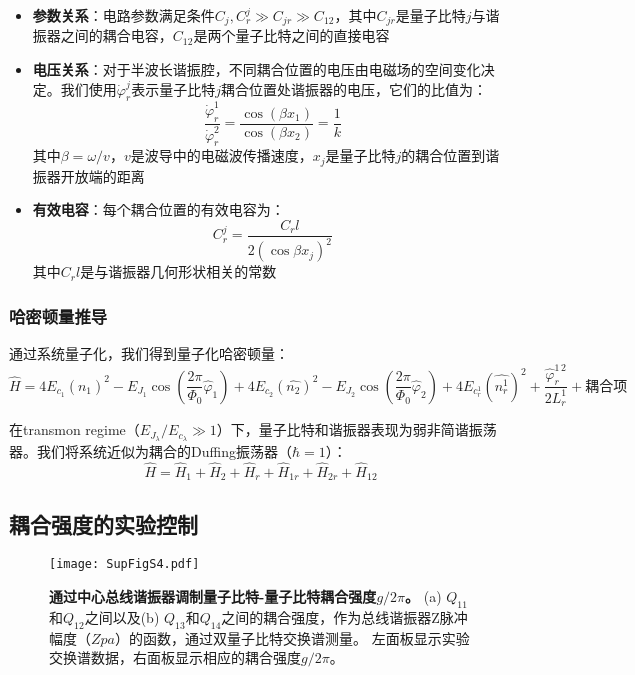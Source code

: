 \documentclass[11pt,a4paper]{article}
\begin{document}
\begin{itemize}
    \item \textbf{参数关系}：电路参数满足条件$C_j, C_r^j \gg C_{jr} \gg C_{12}$，其中$C_{jr}$是量子比特$j$与谐振器之间的耦合电容，$C_{12}$是两个量子比特之间的直接电容
    \item \textbf{电压关系}：对于半波长谐振腔，不同耦合位置的电压由电磁场的空间变化决定。我们使用$\dot{\varphi}_r^j$表示量子比特$j$耦合位置处谐振器的电压，它们的比值为：
    \[
    \frac{\dot{\varphi}_r^1}{\dot{\varphi}_r^2} = \frac{\cos(\beta x_1)}{\cos(\beta x_2)} = \frac{1}{k}
    \]
    其中$\beta = \omega/v$，$v$是波导中的电磁波传播速度，$x_j$是量子比特$j$的耦合位置到谐振器开放端的距离
    \item \textbf{有效电容}：每个耦合位置的有效电容为：
    \[
    C_r^j = \frac{C_r l}{2(\cos\beta x_j)^2}
    \]
    其中$C_r l$是与谐振器几何形状相关的常数
\end{itemize}

\subsubsection{哈密顿量推导}

通过系统量子化，我们得到量子化哈密顿量：
\[
\hat{H} = 4E_{c_1}(\hat{n_1})^2 - E_{J_1}\cos\left(\frac{2\pi}{\Phi_0}\hat{\varphi}_1\right) + 4E_{c_2}(\hat{n_2})^2 - E_{J_2}\cos\left(\frac{2\pi}{\Phi_0}\hat{\varphi}_2\right) + 4E_{c^1_r}(\hat{n^1_r})^2 + \frac{\hat{\varphi}^{1\,2}_r}{2L^1_r} + \text{耦合项}
\]

在transmon regime（$E_{J_\lambda}/E_{c_\lambda} \gg 1$）下，量子比特和谐振器表现为弱非简谐振荡器。我们将系统近似为耦合的Duffing振荡器（$\hbar=1$）：
\[
\hat{H} = \hat{H}_1 + \hat{H}_2 + \hat{H}_r + \hat{H}_{1r} + \hat{H}_{2r} + \hat{H}_{12}
\]

\subsection{耦合强度的实验控制}

\begin{figure}[H]
    \centering
    \texttt{[image: SupFigS4.pdf]}
    \caption{
        \textbf{通过中心总线谐振器调制量子比特-量子比特耦合强度$g/2\pi$。}
        (a) $Q_{11}$和$Q_{12}$之间以及(b) $Q_{13}$和$Q_{14}$之间的耦合强度，作为总线谐振器Z脉冲幅度（$Zpa$）的函数，通过双量子比特交换谱测量。
        左面板显示实验交换谱数据，右面板显示相应的耦合强度$g/2\pi$。
    }
    \label{fig:coupling_modulation}
\end{figure}
\end{document}
